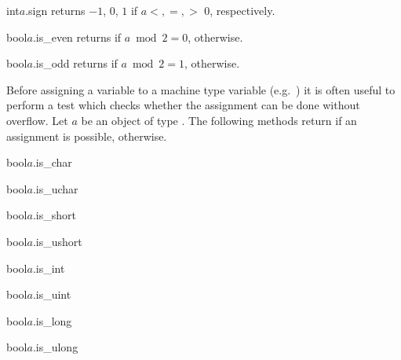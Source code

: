 \begin{cfcode}{int}{$a$.sign}{}
  returns $-1$, $0$, $1$ if $a <, =, >$ 0, respectively.
\end{cfcode}

\begin{cfcode}{bool}{$a$.is_even}{}
  returns \TRUE if $a \bmod 2 = 0$, \FALSE otherwise.
\end{cfcode}

\begin{cfcode}{bool}{$a$.is_odd}{}
  returns \TRUE if $a \bmod 2 = 1$, \FALSE otherwise.
\end{cfcode}



\TYPE

Before assigning a  variable to a machine type variable (e.g.~) it is
often useful to perform a test which checks whether the assignment can be done without overflow.
Let $a$ be an object of type .  The following methods return \TRUE if an
assignment is possible, \FALSE otherwise.

\begin{cfcode}{bool}{$a$.is_char}{}\end{cfcode}
\begin{cfcode}{bool}{$a$.is_uchar}{}\end{cfcode}
\begin{cfcode}{bool}{$a$.is_short}{}\end{cfcode}
\begin{cfcode}{bool}{$a$.is_ushort}{}\end{cfcode}
\begin{cfcode}{bool}{$a$.is_int}{}\end{cfcode}
\begin{cfcode}{bool}{$a$.is_uint}{}\end{cfcode}
\begin{cfcode}{bool}{$a$.is_long}{}\end{cfcode}
\begin{cfcode}{bool}{$a$.is_ulong}{}\end{cfcode}

